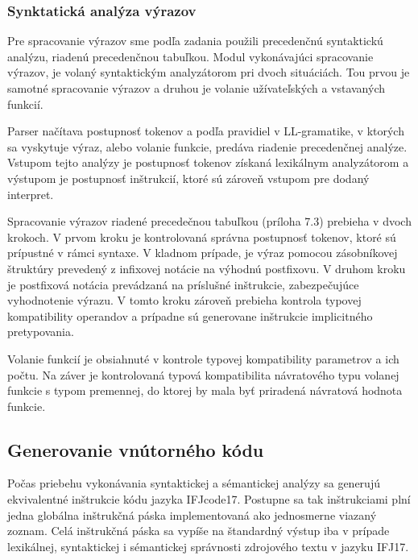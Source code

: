\documentclass[11pt,a4paper]{article}
\begin{document}
		\subsubsection{Synktatická analýza výrazov}

		Pre spracovanie výrazov sme podľa zadania použili precedenčnú syntaktickú analýzu, riadenú precedenčnou tabuľkou. Modul vykonávajúci spracovanie výrazov, je volaný syntaktickým analyzátorom pri dvoch situáciách. Tou prvou je samotné spracovanie výrazov a druhou je volanie užívateľských a vstavaných funkcií.
		
		Parser načítava postupnosť tokenov a podľa pravidiel v LL-gramatike, v ktorých sa vyskytuje výraz, alebo volanie funkcie, predáva riadenie precedenčnej analýze. Vstupom tejto analýzy je postupnosť tokenov získaná lexikálnym analyzátorom a výstupom je postupnosť inštrukcií, ktoré sú zároveň vstupom pre dodaný interpret.
		
		Spracovanie výrazov riadené precedečnou tabuľkou (príloha 7.3) prebieha v dvoch krokoch. V prvom kroku je kontrolovaná správna postupnosť tokenov, ktoré sú prípustné v rámci syntaxe. V kladnom prípade, je výraz pomocou zásobníkovej štruktúry prevedený z infixovej notácie na výhodnú postfixovu. V druhom kroku je postfixová notácia prevádzaná na príslušné inštrukcie, zabezpečujúce vyhodnotenie výrazu. V tomto kroku zároveň prebieha kontrola typovej kompatibility operandov a prípadne sú generovane inštrukcie implicitného pretypovania.
		
		Volanie funkcií je obsiahnuté v kontrole typovej kompatibility parametrov a ich počtu. Na záver je kontrolovaná typová kompatibilita návratového typu volanej funkcie s typom premennej, do ktorej by mala byť priradená návratová hodnota funkcie.


	\subsection{Generovanie vnútorného kódu}

	Počas priebehu vykonávania syntaktickej a sémantickej analýzy sa generujú ekvivalentné inštrukcie kódu jazyka IFJcode17.
	Postupne sa tak inštrukciami plní jedna globálna inštrukčná páska implementovaná ako jednosmerne viazaný zoznam.
	Celá inštrukčná páska sa vypíše na štandardný výstup iba v prípade lexikálnej, syntaktickej i sémantickej správnosti zdrojového textu v jazyku IFJ17.

\end{document}
